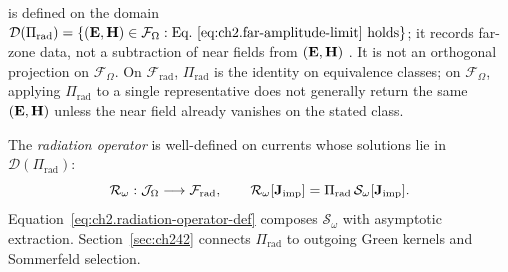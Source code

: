is defined on the domain
$\mathcal{D}(\Pi_{\mathrm{rad}})=\{(\mathbf{E},\mathbf{H})\in\mathcal{F}_\Omega:\text{Eq.~\eqref{eq:ch2.far-amplitude-limit} holds}\}$;
it records far-zone data, not a subtraction of near fields from $(\mathbf{E},\mathbf{H})$ \cite{stratton1941}. It is not an orthogonal projection on $\mathcal{F}_\Omega$. On $\mathcal{F}_{\mathrm{rad}}$, $\Pi_{\mathrm{rad}}$ is the identity on equivalence classes; on $\mathcal{F}_\Omega$, applying $\Pi_{\mathrm{rad}}$ to a single representative does not generally return the same $(\mathbf{E},\mathbf{H})$ unless the near field already vanishes on the stated class.

The \emph{radiation operator} is well-defined on currents whose solutions lie in $\mathcal{D}(\Pi_{\mathrm{rad}})$:
\begin{equation}
\label{eq:ch2.radiation-operator-def}
\mathcal{R}_\omega:\mathcal{J}_\Omega\longrightarrow\mathcal{F}_{\mathrm{rad}},
\qquad
\mathcal{R}_\omega[\mathbf{J}_{\mathrm{imp}}]=\Pi_{\mathrm{rad}}\,\mathcal{S}_\omega[\mathbf{J}_{\mathrm{imp}}].
\end{equation}
Equation~\eqref{eq:ch2.radiation-operator-def} composes $\mathcal{S}_\omega$ with asymptotic extraction. Section~\ref{sec:ch242} connects $\Pi_{\mathrm{rad}}$ to outgoing Green kernels and Sommerfeld selection.

